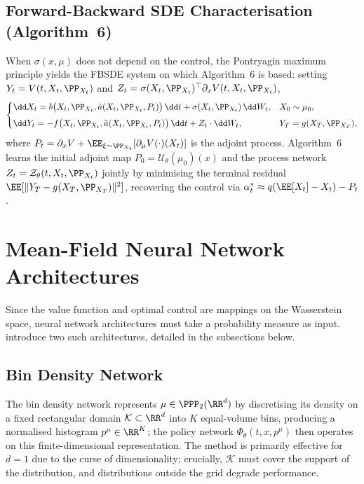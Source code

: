 \documentclass[11pt]{article}
\begin{document}
\subsection{Forward-Backward SDE Characterisation (Algorithm~6)}

When $\sigma(x,\mu)$ does not depend on the control, the Pontryagin maximum principle yields the FBSDE system on which Algorithm~6 is based: setting $Y_t = V(t,X_t,\PP_{X_t})$ and $Z_t = \sigma(X_t,\PP_{X_t})^\top\partial_x V(t,X_t,\PP_{X_t})$,
\begin{equation}\label{eq:fbsde}
  \begin{cases}
    \dd X_t = b\big(X_t, \PP_{X_t}, \hat{a}(X_t, \PP_{X_t}, P_t)\big)\,\dd t + \sigma(X_t, \PP_{X_t})\,\dd W_t, & X_0 \sim \mu_0, \\[4pt]
    \dd Y_t = -f\big(X_t, \PP_{X_t}, \hat{a}(X_t, \PP_{X_t}, P_t)\big)\,\dd t + Z_t \cdot \dd W_t, & Y_T = g(X_T, \PP_{X_T}),
  \end{cases}
\end{equation}
where $P_t = \partial_x V + \EE_{\xi \sim \PP_{X_t}}[\partial_\mu V(\cdot)(X_t)]$ is the adjoint process. Algorithm~6 learns the initial adjoint map $P_0 = \mathcal{U}_\theta(\mu_0)(x)$ and the process network $Z_t = \mathcal{Z}_\theta(t,X_t,\PP_{X_t})$ jointly by minimising the terminal residual $\EE[\|Y_T - g(X_T,\PP_{X_T})\|^2]$, recovering the control via $\alpha_t^* \approx q(\EE[X_t]-X_t) - P_t$.


\section{Mean-Field Neural Network Architectures}\label{sec:appendix-mfnn}

Since the value function and optimal control are mappings on the Wasserstein space, neural network architectures must take a probability measure as input. \citet{pham2024mfnn} introduce two such architectures, detailed in the subsections below.

\subsection{Bin Density Network}

The bin density network represents $\mu \in \PPP_2(\RR^d)$ by discretising its density on a fixed rectangular domain $\mathcal{K} \subset \RR^d$ into $K$ equal-volume bins, producing a normalised histogram $p^\mu \in \RR^K$; the policy network $\Phi_\theta(t, x, p^\mu)$ then operates on this finite-dimensional representation. The method is primarily effective for $d = 1$ due to the curse of dimensionality; crucially, $\mathcal{K}$ must cover the support of the distribution, and distributions outside the grid degrade performance.
\end{document}
